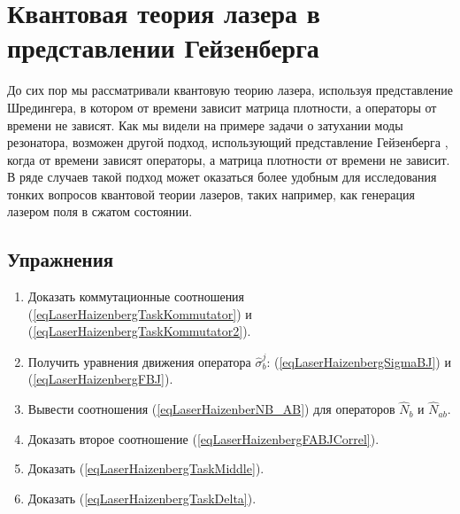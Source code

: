 \chapter{Квантовая теория лазера в представлении Гейзенберга}

До сих пор мы рассматривали квантовую теорию лазера, используя
представление Шредингера, в котором от времени зависит матрица
плотности, а операторы от времени не зависят. Как мы видели на примере
задачи о затухании моды резонатора, возможен другой подход,
использующий представление Гейзенберга
\cite{bScullyQuantumOptics2003}, 
когда от времени зависят
операторы, а матрица плотности от времени не зависит. В ряде случаев
такой подход может оказаться более удобным для исследования тонких
вопросов квантовой теории лазеров, таких например, как генерация
лазером поля в сжатом состоянии. 






\section{Упражнения}
\begin{enumerate}
\item Доказать коммутационные соотношения
  (\ref{eqLaserHaizenbergTaskKommutator}) и (\ref{eqLaserHaizenbergTaskKommutator2}).
\item Получить уравнения движения оператора $\hat{\sigma}_b^j$: (\ref{eqLaserHaizenbergSigmaBJ}) и 
(\ref{eqLaserHaizenbergFBJ}).
\item Вывести соотношения (\ref{eqLaserHaizenberNB_AB}) для
  операторов $\hat{N}_b$ и $\hat{N}_{ab}$.
\item Доказать второе соотношение (\ref{eqLaserHaizenbergFABJCorrel}).
\item Доказать (\ref{eqLaserHaizenbergTaskMiddle}).
\item Доказать (\ref{eqLaserHaizenbergTaskDelta}).
\end{enumerate}

